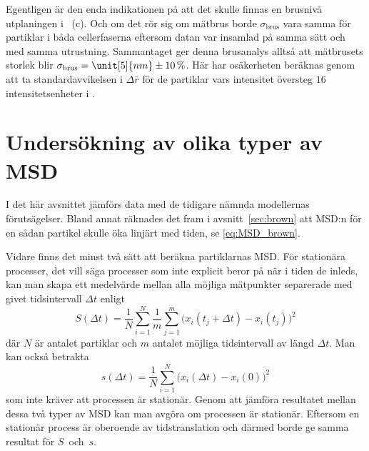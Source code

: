 Egentligen är den enda indikationen på att det skulle finnas en brusnivå utplaningen\footnotemark{} i ~(c). Och om det rör sig om mätbrus borde $\sigma_\text{brus}$ vara samma för partiklar i båda cellerfaserna eftersom datan var insamlad på samma sätt och med samma utrustning. Sammantaget ger denna brusanalys alltså att mätbrusets storlek blir $\sigma_\text{brus}=\unit[5]{nm} \pm 10\,\%$. Här har osäkerheten beräknas genom att ta standardavvikelsen i $\Delta\bar{r}$ för de partiklar vars intensitet översteg $16$\,intensitetsenheter i .





\section{Undersökning av olika typer av MSD}

I det här avsnittet jämförs data med de tidigare nämnda modellernas förutsägelser. Bland annat räknades det fram i avsnitt~\ref{sec:brown} att MSD:n för en sådan partikel skulle öka linjärt med tiden, se \eqref{eq:MSD_brown}.

Vidare finns det minst två sätt att beräkna partiklarnas MSD. För stationära processer, det vill säga processer som inte explicit beror på när i tiden de inleds, kan man skapa ett medelvärde mellan alla möjliga mätpunkter separerade med givet tidsintervall $\Delta{t}$ enligt
\begin{equation} \label{eq:MSD_S}
S(\Delta t)= \frac{1}{N}\sum^N_{i=1}\frac{1}{m}\sum^m_{j=1}
\Big( x_i(t_j+\Delta t)-x_i(t_j) \Big)^2
\end{equation} 
där $N$ är antalet partiklar och $m$ antalet möjliga tidsintervall av längd $\Delta t$. 
Man kan också betrakta
\begin{equation} \label{eq:MSD_s}%
s(\Delta t)= \frac{1}{N}\sum^N_{i=1}
\Big( x_i(\Delta t)-x_i(0)\Big )^2
\end{equation} 
som inte kräver att processen är stationär.
Genom att jämföra resultatet mellan dessa två typer av MSD kan man avgöra om processen är stationär. Eftersom en stationär process är oberoende av tidstranslation och därmed borde ge samma resultat för $S$~och~$s$. 

